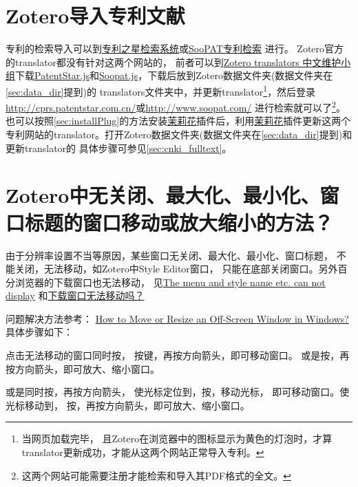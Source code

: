 \documentclass[theorem=false,mathfont=none,openany,sub3section]{easybook}
\begin{document}
{\section{Zotero导入专利文献}\label{sec:Patent}
专利的检索导入可以到\href{http://cprs.patentstar.com.cn/}{专利之星检索系统}或\href{http://www.soopat.com/}{SooPAT专利检索}
进行。
Zotero官方的translator都没有针对这两个网站的，
前者可以到\href{https://github.com/l0o0/translators_CN}
{Zotero translators 中文维护小组}下载\href{https://raw.githubusercontent.com/l0o0/translators_CN/master/PatentStar.js}{PatentStar.js}和\href{https://raw.githubusercontent.com/l0o0/translators_CN/master/Soopat.js}{Soopat.js}，下载后放到Zotero数据文件夹(数据文件夹在\cref{sec:data_dir}提到)的
translators文件夹中，并更新translator\footnote{当网页加载完毕，
	且Zotero在浏览器中的图标显示为黄色的灯泡时，才算translator更新成功，才能从这两个网站正常导入专利。}，然后登录
\url{http://cprs.patentstar.com.cn/}或\url{http://www.soopat.com/}
进行检索就可以了\footnote{这两个网站可能需要注册才能检索和导入其PDF格式的全文。}。
也可以按照\cref{sec:installPlug}的方法安装\href{https://github.com/l0o0/jasminum}{茉莉花}插件后，利用\href{https://github.com/l0o0/jasminum}{茉莉花}插件更新这两个专利网站的translator。打开Zotero数据文件夹(数据文件夹在\cref{sec:data_dir}提到)和更新translator的
具体步骤可参见\cref{sec:cnki_fulltext}。

\section{Zotero中无关闭、最大化、最小化、窗口标题的窗口移动或放大缩小的方法？}\label{sec:no_max}	
由于分辨率设置不当等原因，某些窗口无关闭、最大化、最小化、窗口标题，
不能关闭，无法移动，如Zotero中Style Editor窗口，
只能在底部关闭窗口。另外百分浏览器的下载窗口也无法移动，
见\href{https://forums.zotero.org/discussion/86939/
	the-menu-and-style-name-etc-can-not-display#latest}{The menu and style name etc. can not display}
和\href{https://www.centbrowser.net/zh-cn/forum.php?mod=viewthread&tid=8321&extra=}{下载窗口无法移动吗？}

问题解决方法参考：
\href{https://www.askvg.com/how-to-move-or-resize-an-off-screen-window-in-windows/}{How to Move or Resize an Off-Screen Window in Windows?}
具体步骤如下：

点击无法移动的窗口同时按，
按键，再按方向箭头，即可移动窗口。
或是按，再按方向箭头，即可放大、缩小窗口。

或是同时按，再按方向箭头，
使光标定位到，按，移动光标，
即可移动窗口。使光标移动到，
按，再按方向箭头，即可放大、缩小窗口。

}
\end{document}
